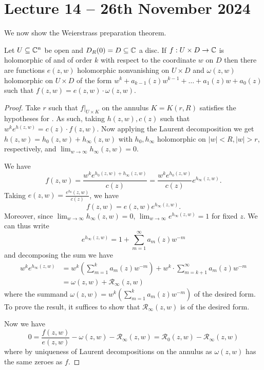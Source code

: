 \section{Lecture 14 -- 26th November 2024}\label{sec: lecture 14}
We now show the Weierstrass preparation theorem. 
\begin{theorem}\label{thm: Weierstrass preparation}
    Let $U\subseteq\mathbb{C}^{n}$ be open and $D_{R}(0)=D\subseteq\mathbb{C}$ a disc. If $f:U\times D\to\mathbb{C}$ is holomorphic of and of order $k$ with respect to the coordinate $w$ on $D$ then there are functions $e(z,w)$ holomorphic nonvanishing on $U\times D$ and $\omega(z,w)$ holomorphic on $U\times D$ of the form $w^{k}+a_{k-1}(z)w^{k-1}+\dots+a_{1}(z)w+a_{0}(z)$ such that $f(z,w)=e(z,w)\cdot\omega(z,w)$.
\end{theorem}
\begin{proof}
    Take $r$ such that $f|_{U\times K}$ on the annulus $K=K(r,R)$ satisfies the hypotheses for . As such, taking $h(z,w),c(z)$ such that $w^{k}e^{h(z,w)}=c(z)\cdot f(z,w)$. Now applying the Laurent decomposition  we get $h(z,w)=h_{0}(z,w)+h_{\infty}(z,w)$ with $h_{0},h_{\infty}$ holomorphic on $|w|<R,|w|>r$, respectively, and $\lim_{w\to\infty}h_{\infty}(z,w)=0$. 

    We have 
    $$f(z,w)=\frac{w^{k}e^{h_{0}(z,w)+h_{\infty}(z,w)}}{c(z)}=\frac{w^{k}e^{h_{0}(z,w)}}{c(z)}e^{h_{\infty}(z,w)}.$$
    Taking $e(z,w)=\frac{e^{h_{0}}(z,w)}{c(z)}$, we have 
    $$f(z,w)=e(z,w)e^{h_{\infty}(z,w)}.$$
    Moreover, since $\lim_{w\to\infty}h_{\infty}(z,w)=0$, $\lim_{w\to\infty}e^{h_{\infty}(z,w)}=1$ for fixed $z$. We can thus write 
    $$e^{h_{\infty}(z,w)}=1+\sum_{m=1}^{\infty}a_{m}(z)w^{-m}$$
    and decomposing the sum we have 
    \begin{align*}
        w^{k}e^{h_{\infty}(z,w)}&=w^{k}\left(\sum_{m=1}^{k}a_{m}(z)w^{-m}\right)+w^{k}\cdot\sum_{m=k+1}^{\infty}a_{m}(z)w^{-m}\\
        &=\omega(z,w)+\mathcal{R}_{\infty}(z,w)
    \end{align*}
    where the summand $\omega(z,w)=w^{k}\left(\sum_{m=1}^{k}a_{m}(z)w^{-m}\right)$ of the desired form. To prove the result, it suffices to show that $\mathcal{R}_{\infty}(z,w)$ is of the desired form. 

    Now we have 
    $$0=\frac{f(z,w)}{e(z,w)}-\omega(z,w)-\mathcal{R}_{\infty}(z,w)=\mathcal{R}_{0}(z,w)-\mathcal{R}_{\infty}(z,w)$$
    where by uniqueness of Laurent decompositions on the annulus as $\omega(z,w)$ has the same zeroes as $f$. 
\end{proof}
